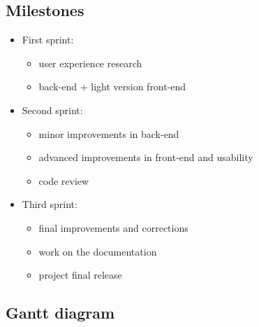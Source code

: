 \documentclass[12pt]{article}
\begin{document}
\subsection{Milestones}
\begin{itemize}

    \item First sprint: 

        \begin{itemize}

            \item user experience research

            \item back-end + light version front-end

        \end{itemize}

    \item Second sprint:

        \begin{itemize}

            \item minor improvements in back-end

            \item advanced improvements in front-end and usability 

            \item code review

        \end{itemize}

    \item Third sprint:

        \begin{itemize}

            \item final improvements and corrections

            \item work on the documentation
            
            \item project final release

        \end{itemize}
      
\end{itemize}



\subsection{Gantt diagram}
\end{document}
